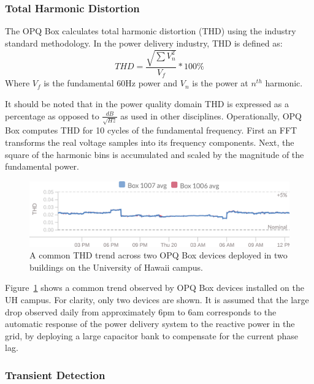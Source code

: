 \subsubsection{Total Harmonic Distortion}\label{subsec:thd}

The OPQ Box calculates total harmonic distortion (THD) using the industry standard methodology.
In the power delivery industry, THD is defined as:
\begin{equation} \label{eq:4}
THD = \frac{\sqrt{\sum{V_{n}^2}}}{V_{f}}*100\%
\end{equation}
Where $V_{f}$ is the fundamental 60Hz power and $V_{n}$ is the power at $n^{th}$ harmonic.

It should be noted that in the power quality domain THD is expressed as a percentage as opposed to $\frac{dB}{\sqrt{Hz}}$ as used in other disciplines.
Operationally, OPQ Box computes THD for 10 cycles of the fundamental frequency.
First an FFT transforms the real voltage samples into its frequency components.
Next, the square of the harmonic bins is accumulated and scaled by the magnitude of the fundamental power.

\begin{figure}[ht]
	\centering
	\includegraphics[width=1\linewidth]{images/opq-box/thd_two_devices_24_hours.png}
	\caption{A common THD trend across two OPQ Box devices deployed in two buildings on the University of Hawaii campus.}
	\label{fig:opq:7}
\end{figure}

Figure~\ref{fig:opq:7} shows a common trend observed by OPQ Box devices installed on the UH campus.
For clarity, only two devices are shown.
It is assumed that the large drop observed daily from approximately 6pm to 6am corresponds to the automatic response of the power delivery system to the reactive power in the grid, by deploying a large capacitor bank to compensate for the current phase lag.

\subsubsection{Transient Detection}\label{subsec:transient-detection}

